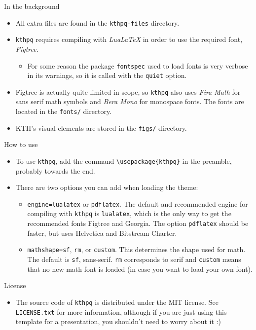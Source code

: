 \documentclass[17pt, t, lualatex]{beamer}
\def\kthpq{\texttt{kthpq}}
\begin{document}
\begin{frame}{In the background}
\begin{itemize}
\item All extra files are found in the \texttt{kthpq-files} directory.
\item \kthpq{} requires compiling with \emph{LuaLaTeX} in order to use the required font, \emph{Figtree}.
\begin{itemize}
\item For some reason the package \texttt{fontspec} used to load fonts is very verbose in its warnings, so it is called with the \texttt{quiet} option.
\end{itemize}
\item Figtree is actually quite limited in scope, so \kthpq{} also uses \emph{Fira Math} for sans serif math symbols and \emph{Bera Mono} for monospace fonts. The fonts are located in the \texttt{fonts/} directory.
\item KTH's visual elements are stored in the \texttt{figs/} directory.
\end{itemize}
\end{frame}

\begin{frame}[fragile=singleslide]{How to use}
\begin{itemize}
\item To use \kthpq{}, add the command \verb|\usepackage{kthpq}| in the preamble, probably towards the end.
\item There are two options you can add when loading the theme:
\begin{itemize}
\item \texttt{engine=lualatex} or \texttt{pdflatex}. The default and recommended engine for compiling with \kthpq{} is \texttt{lualatex}, which is the only way to get the recommended fonts Figtree and Georgia. The option \texttt{pdflatex} should be faster, but uses Helvetica and Bitstream Charter.
\item \texttt{mathshape=sf}, \texttt{rm}, or \texttt{custom}. This determines the shape used for math. The default is \texttt{sf}, sans-serif. \texttt{rm} corresponds to serif and \texttt{custom} means that no new math font is loaded (in case you want to load your own font).
\end{itemize}
\end{itemize}
\end{frame}

\begin{frame}{License}
\begin{itemize}
\item The source code of \kthpq{} is distributed under the MIT license. See \texttt{LICENSE.txt} for more information, although if you are just using this template for a presentation, you shouldn't need to worry about it :)
\end{itemize}
\end{frame}
\end{document}
